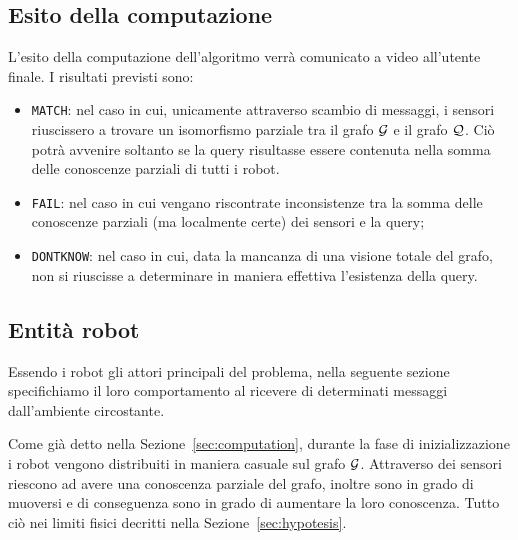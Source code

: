 \documentclass{llncs}
\begin{document}
\subsection{Esito della computazione}
L'esito della computazione dell'algoritmo verrà comunicato a video all'utente finale.
I risultati previsti sono:
\begin{itemize}
\item \texttt{MATCH}: nel caso in cui, unicamente attraverso scambio di messaggi,
i sensori riuscissero a trovare un isomorfismo parziale tra il grafo $\mathcal{G}$ e il grafo $\mathcal{Q}$.
Ciò potrà avvenire soltanto se la query risultasse essere contenuta nella somma delle conoscenze
parziali di tutti i robot.
\item \texttt{FAIL}: nel caso in cui vengano riscontrate inconsistenze tra la somma
  delle conoscenze parziali (ma localmente certe) dei sensori e la query;
\item \texttt{DONTKNOW}: nel caso in cui, data la mancanza di una visione
  totale del grafo, non si riuscisse a determinare in maniera effettiva l'esistenza della query.
\end{itemize}

\subsection{Entità robot}
Essendo i robot gli attori principali del problema,
nella seguente sezione specifichiamo il loro comportamento
al ricevere di determinati messaggi dall'ambiente circostante.

Come già detto nella Sezione~\ref{sec:computation},
durante la fase di inizializzazione i robot vengono distribuiti
in maniera casuale sul grafo $\mathcal{G}$.
Attraverso dei sensori riescono ad avere una conoscenza parziale
del grafo, inoltre sono in grado di muoversi e di conseguenza
sono in grado di aumentare la loro conoscenza. Tutto ciò nei limiti
fisici decritti nella Sezione~\ref{sec:hypotesis}.
\end{document}
